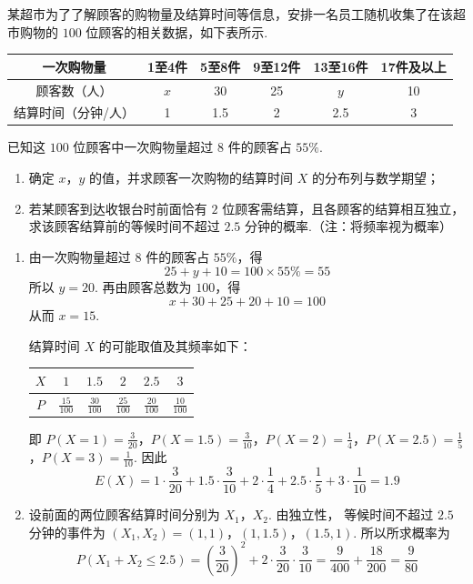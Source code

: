 \begin{problem}
某超市为了了解顾客的购物量及结算时间等信息，安排一名员工随机收集了在该超市购物的 \(100\) 位顾客的相关数据，如下表所示.

\begin{center}
\begin{tabular}{|c|c|c|c|c|c|}
\hline
一次购物量 & 1至4件 & 5至8件 & 9至12件 & 13至16件 & 17件及以上 \\
\hline
顾客数（人） & \(x\) & 30 & 25 & \(y\) & 10 \\
\hline
结算时间（分钟/人） & 1 & 1.5 & 2 & 2.5 & 3 \\
\hline
\end{tabular}
\end{center}

已知这 \(100\) 位顾客中一次购物量超过 \(8\) 件的顾客占 \(55\%\).

\begin{enumerate}
\item 确定 \(x\)，\(y\) 的值，并求顾客一次购物的结算时间 \(X\) 的分布列与数学期望；
\item 若某顾客到达收银台时前面恰有 \(2\) 位顾客需结算，且各顾客的结算相互独立，求该顾客结算前的等候时间不超过 \(2.5\) 分钟的概率.（注：将频率视为概率）
\end{enumerate}

\begin{solution}
\begin{enumerate}
\item 由一次购物量超过 \(8\) 件的顾客占 \(55\%\)，得
\[
25+y+10=100\times55\%=55
\]
所以 \(y=20\). 再由顾客总数为 \(100\)，得
\[
x+30+25+20+10=100
\]
从而 \(x=15\).

结算时间 \(X\) 的可能取值及其频率如下：
\begin{center}
\begin{tabular}{|c|c|c|c|c|c|}
\hline
\(X\)&\(1\)&\(1.5\)&\(2\)&\(2.5\)&\(3\)\\
\hline
\(P\)&\(\frac{15}{100}\)&\(\frac{30}{100}\)&\(\frac{25}{100}\)&\(\frac{20}{100}\)&\(\frac{10}{100}\)\\
\hline
\end{tabular}
\end{center}
即 \(P(X=1)=\frac3{20}\)，\(P(X=1.5)=\frac3{10}\)，\(P(X=2)=\frac14\)，\(P(X=2.5)=\frac15\)，\(P(X=3)=\frac1{10}\).
因此
\[
E(X)=1\cdot\frac3{20}+1.5\cdot\frac3{10}+2\cdot\frac14
+2.5\cdot\frac15+3\cdot\frac1{10}=1.9
\]

\item 设前面的两位顾客结算时间分别为 \(X_1\)，\(X_2\). 由独立性，
等候时间不超过 \(2.5\) 分钟的事件为
\((X_1,X_2)=(1,1)\)，\((1,1.5)\)，\((1.5,1)\).
所以所求概率为
\[
P(X_1+X_2\leqslant2.5)=\left(\frac3{20}\right)^2
 +2\cdot\frac3{20}\cdot\frac3{10}
 =\frac9{400}+\frac{18}{200}
 =\frac9{80}
\]
\end{enumerate}
\end{solution}
\end{problem}

